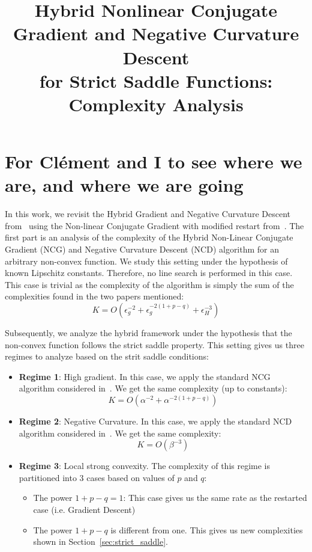 \documentclass{article}
\begin{document}
\title{Hybrid Nonlinear Conjugate Gradient and Negative Curvature Descent \\ for Strict Saddle Functions: Complexity Analysis}
\author{}
\date{}
\maketitle



\section*{For Clément and I to see where we are, and where we are going}
In this work, we revisit the Hybrid Gradient and Negative Curvature Descent from~\cite{WrightMa2022}
using the Non-linear Conjugate Gradient with modified restart from~\cite{RoyerChan2022}. 
The first part is an analysis of the complexity of the Hybrid Non-Linear Conjugate Gradient (NCG) and Negative Curvature Descent (NCD) algorithm
for an arbitrary non-convex function. We study this setting under the hypothesis of known Lipschitz constants. 
Therefore, no line search is performed in this case. This case is trivial as the 
complexity of the algorithm is simply the sum of the complexities found in the two papers mentioned:
\begin{equation}
    K = O(\epsilon_g^{-2} + \epsilon_g^{-2(1+p-q)} + \epsilon_H^{-3})
\end{equation}

Subsequently, we analyze the hybrid framework under the hypothesis that the non-convex function 
follows the strict saddle property. This setting gives us three regimes to analyze based on the strit saddle conditions:
\begin{itemize}
    \item \textbf{Regime 1}: High gradient. In this case, we apply the standard NCG algorithm considered 
    in~\cite{RoyerChan2022}. We get the same complexity (up to constants):
    \begin{equation}
        K = O(\alpha^{-2} + \alpha^{-2(1 + p - q)})
    \end{equation}
    \item \textbf{Regime 2}: Negative Curvature. In this case, we apply the standard NCD algorithm 
    considered in~\cite{WrightMa2022}. We get the same complexity:
    \begin{equation}
        K = O(\beta^{-3})
    \end{equation}
    \item \textbf{Regime 3}: Local strong convexity. The complexity of this regime is partitioned into 3 cases based 
    on values of $p$ and $q$:
        \begin{itemize}
        \item The power $1+p-q = 1$: This case gives us the same rate as the restarted case (i.e. Gradient Descent)
        \item The power $1+p-q$ is different from one. This gives us new complexities shown in Section~\ref{sec:strict_saddle}.
    \end{itemize}
\end{itemize}
\end{document}

